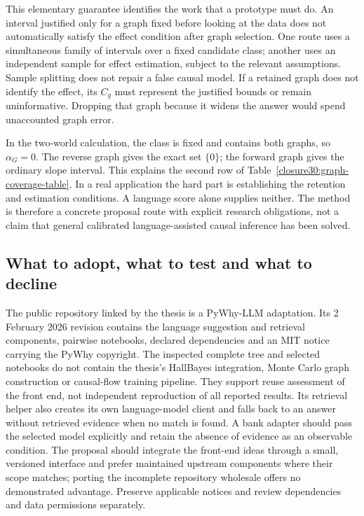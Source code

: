 This elementary guarantee identifies the work that a prototype must do.
An interval justified only for a graph fixed before looking at the data
does not automatically satisfy the effect condition after graph selection.
One route uses a simultaneous family of intervals over a fixed candidate
class; another uses an independent sample for effect estimation, subject to
the relevant assumptions. Sample splitting does not repair a false causal
model. If a retained graph does not identify the effect, its $C_g$ must
represent the justified bounds or remain uninformative. Dropping that graph
because it widens the answer would spend unaccounted graph error.

In the two-world calculation, the class is fixed and contains both graphs,
so $\alpha_G=0$. The reverse graph gives the exact set $\{0\}$; the forward
graph gives the ordinary slope interval. This explains the second row of
Table~\ref{closure30:graph-coverage-table}. In a real application the hard
part is establishing the retention and estimation conditions. A language
score alone supplies neither. The method is therefore a concrete proposal
route with explicit research obligations, not a claim that general calibrated
language-assisted causal inference has been solved.

\subsection{What to adopt, what to test and what to decline}

The public repository linked by the thesis is a PyWhy-LLM adaptation. Its
2 February 2026 revision contains the language suggestion and retrieval
components, pairwise notebooks, declared dependencies and an MIT notice
carrying the PyWhy copyright. The inspected complete tree and selected
notebooks do not contain the thesis's HallBayes integration, Monte Carlo
graph construction or causal-flow training pipeline. They support reuse
assessment of the front end, not independent reproduction of all reported
results. Its retrieval helper also creates its own language-model client and
falls back to an answer without retrieved evidence when no match is found.
A bank adapter should pass the selected model explicitly and retain the
absence of evidence as an observable condition. The proposal should
integrate the front-end ideas through a small,
versioned interface and prefer maintained upstream components where their
scope matches; porting the incomplete repository wholesale offers no
demonstrated advantage. Preserve applicable notices and review dependencies
and data permissions separately.
\citep{closure30molerocode}


